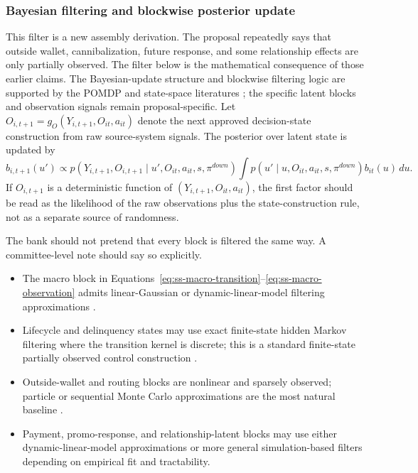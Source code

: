 \documentclass[11pt]{article}
\newcommand{\1}{\mathbf{1}}
\begin{document}
\subsubsection{Bayesian filtering and blockwise posterior update}
\label{subsec:state-space-filtering}

This filter is a new assembly derivation. The proposal repeatedly says that
outside wallet, cannibalization, future response, and some relationship effects
are only partially observed. The filter below is the mathematical consequence of
those earlier claims. The Bayesian-update structure and blockwise filtering logic
are supported by the POMDP and state-space literatures
\citep{smallwood1973pomdp,kaelbling1998pomdp,durbinkoopman2012ssm,
westharrison1997bfdm,doucet2001smc}; the specific latent blocks and observation
signals remain proposal-specific. Let $O_{i,t+1}=g_O(Y_{i,t+1},O_{it},a_{it})$
denote the next approved decision-state construction from raw source-system
signals. The posterior over latent state is updated by
\begin{equation}
  b_{i,t+1}(u')
  \propto
  p(Y_{i,t+1},O_{i,t+1}\mid u',O_{it},a_{it},s,\pi^{down})
  \int p(u'\mid u,O_{it},a_{it},s,\pi^{down})b_{it}(u)\,du.
  \label{eq:ss-filter-update}
\end{equation}
If $O_{i,t+1}$ is a deterministic function of $(Y_{i,t+1},O_{it},a_{it})$, the
first factor should be read as the likelihood of the raw observations plus the
state-construction rule, not as a separate source of randomness.

The bank should not pretend that every block is filtered the same way. A
committee-level note should say so explicitly.
\begin{itemize}[leftmargin=*]
  \item The macro block in Equations~\eqref{eq:ss-macro-transition}--\eqref{eq:ss-macro-observation}
        admits linear-Gaussian or dynamic-linear-model filtering approximations
        \citep{durbinkoopman2012ssm,westharrison1997bfdm}.
  \item Lifecycle and delinquency states may use exact finite-state hidden
        Markov filtering where the transition kernel is discrete; this is a
        standard finite-state partially observed control construction
        \citep{smallwood1973pomdp,kaelbling1998pomdp}.
  \item Outside-wallet and routing blocks are nonlinear and sparsely observed;
        particle or sequential Monte Carlo approximations are the most natural
        baseline \citep{doucet2001smc}.
  \item Payment, promo-response, and relationship-latent blocks may use either
        dynamic-linear-model approximations or more general simulation-based
        filters depending on empirical fit and tractability.
\end{itemize}
\end{document}
